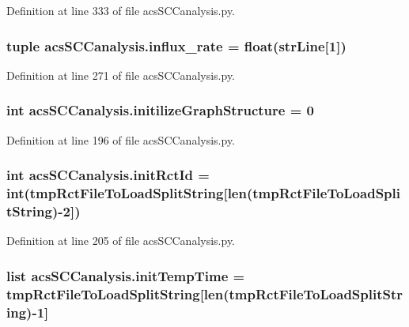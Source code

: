Definition at line 333 of file acs\-S\-C\-Canalysis.\-py.

\hypertarget{a00128_a3a8adee26325d72aca909e91b0fd3ea5}{
\subsubsection[{influx\-\_\-rate}]{\setlength{\rightskip}{0pt plus 5cm}tuple acs\-S\-C\-Canalysis.\-influx\-\_\-rate = float({\bf str\-Line}\mbox{[}1\mbox{]})}}\label{a00128_a3a8adee26325d72aca909e91b0fd3ea5}


Definition at line 271 of file acs\-S\-C\-Canalysis.\-py.

\hypertarget{a00128_ac6ad18bfc83e8ea3254897d46f990855}{
\subsubsection[{initilize\-Graph\-Structure}]{\setlength{\rightskip}{0pt plus 5cm}int acs\-S\-C\-Canalysis.\-initilize\-Graph\-Structure = 0}}\label{a00128_ac6ad18bfc83e8ea3254897d46f990855}


Definition at line 196 of file acs\-S\-C\-Canalysis.\-py.

\hypertarget{a00128_a212643643fc6b002e8797f16633bb16d}{
\subsubsection[{init\-Rct\-Id}]{\setlength{\rightskip}{0pt plus 5cm}int acs\-S\-C\-Canalysis.\-init\-Rct\-Id = int({\bf tmp\-Rct\-File\-To\-Load\-Split\-String}\mbox{[}len({\bf tmp\-Rct\-File\-To\-Load\-Split\-String})-\/2\mbox{]})}}\label{a00128_a212643643fc6b002e8797f16633bb16d}


Definition at line 205 of file acs\-S\-C\-Canalysis.\-py.

\hypertarget{a00128_adc4403c4cfe080918c8b9da692c50509}{
\subsubsection[{init\-Temp\-Time}]{\setlength{\rightskip}{0pt plus 5cm}list acs\-S\-C\-Canalysis.\-init\-Temp\-Time = {\bf tmp\-Rct\-File\-To\-Load\-Split\-String}\mbox{[}len({\bf tmp\-Rct\-File\-To\-Load\-Split\-String})-\/1\mbox{]}}}\label{a00128_adc4403c4cfe080918c8b9da692c50509}


